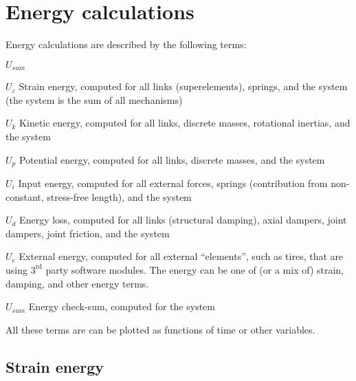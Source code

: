 %
%

%
%

\section{Energy calculations}

Energy calculations are described by the following terms:

\begin{namelist}{$U_{sum}$}

\item[$U_\varepsilon$]
Strain energy,  computed for all links (superelements), springs, 
and the system (the system is the sum of all mechanisms)

\item[$U_{k}$]
Kinetic energy,  computed for all links, 
discrete masses, rotational inertias, and the system

\item[$U_{p}$]
Potential energy,  computed for all links, 
discrete masses, and the system

\item[$U_{i}$]
Input energy,  computed for all external forces, 
springs (contribution from non-constant, stress-free length), and the system

\item[$U_{d}$]
Energy loss,  computed for all links (structural 
damping), axial dampers, joint dampers, joint friction, and the system

\item[$U_{e}$]
External energy, computed for all external ``elements'', such as tires, that are using
$3^\text{rd}$ party software modules. The energy can be one of (or a mix of) strain,
damping, and other energy terms.

\item[$U_{sum}$]
Energy check-sum, computed for the system
\end{namelist}

\noindent
All these terms are can be plotted as functions of time or other 
variables.

\subsection{Strain energy}

